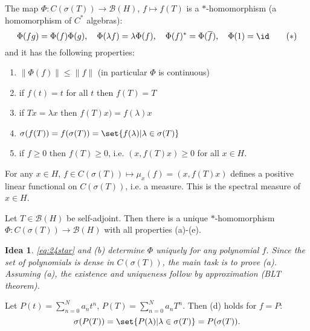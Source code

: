 \documentclass{article}
\newtheorem*{idea}{Idea}
\begin{document}
\begin{thm}
    The map $\Phi: C(\sigma(T)) \to \mathcal{B}(H)$, $f \mapsto f(T)$ is a $*$-homomorphism (a homomorphism of $C^*$ algebras):
    \begin{equation*}
        \Phi(fg) = \Phi(f) \Phi(g), \quad \Phi(\lambda f) = \lambda \Phi(f), \quad \Phi(f)^* = \Phi(\overline{f}), \quad \Phi(1) = \id
        \tag{$*$} \label{eq:24star}
    \end{equation*}
    and it has the following properties:
    \begin{enumerate}[label=\alph*]
        \item $\|\Phi(f)\| \leq \|f\|$ (in particular $\Phi$ is continuous)
        \item if $f(t) = t$ for all $t$ then $f(T) = T$
        \item if $T x = \lambda x$ then $f(T) x) = f(\lambda) x$
        \item $\sigma(f(T)) = f(\sigma(T)) = \set{f(\lambda) | \lambda \in \sigma(T)}$
        \item if $f \geq 0$ then $f(T) \geq 0$, i.e. $(x, f(T) x) \geq 0$ for all $x \in H$.
    \end{enumerate}
\end{thm}

\begin{remark}
    For any $x \in H$, $f \in C(\sigma(T)) \mapsto \mu_x(f) = (x, f(T) x)$ defines a positive linear functional on $C(\sigma(T))$, i.e. a measure.
    This is the spectral measure of $x \in H$.
\end{remark}

\begin{thm}
    Let $T \in \mathcal{B}(H)$ be self-adjoint.
    Then there is a unique $*$-homomorphism $\Phi: C(\sigma(T)) \to \mathcal{B}(H)$ with all properties (a)-(e).
\end{thm}

\begin{idea}
    \eqref{eq:24star} and (b) determine $\Phi$ uniquely for any polynomial $f$.
    Since the set of polynomials is dense in $C(\sigma(T))$, the main task is to prove (a).
    Assuming (a), the existence and uniqueness follow by approximation (BLT theorem).
\end{idea}

\begin{lemma}
    Let $P(t) = \sum_{n=0}^N a_n t^n$, $P(T) = \sum_{n=0}^N a_n T^n$. Then (d) holds for $f = P$:
    \begin{equation*}
        \sigma(P(T)) = \set{P(\lambda) | \lambda \in \sigma(T)} = P(\sigma(T)).
    \end{equation*}
\end{lemma}
\end{document}
